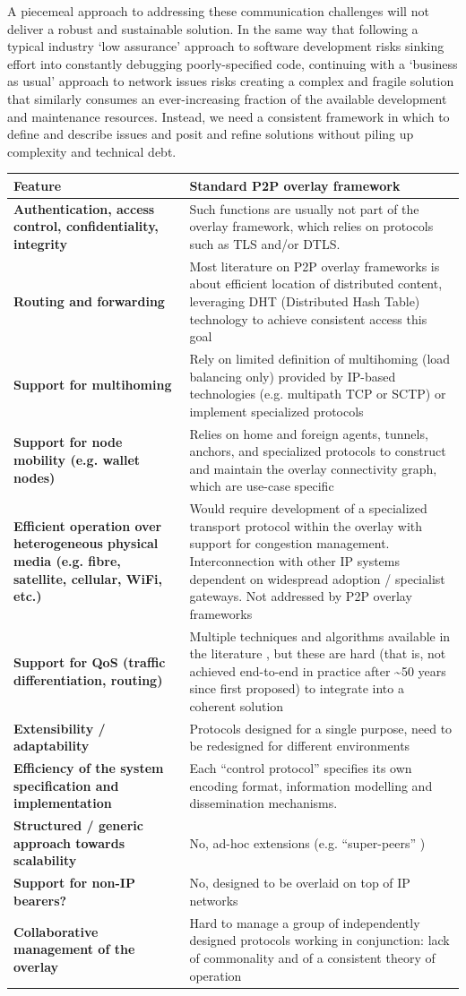 \documentclass[11pt,a4paper]{article}
\begin{document}
A piecemeal approach to addressing these communication challenges will
not deliver a robust and sustainable solution. In the same way that
following a typical industry `low assurance' approach to software
development risks sinking effort into constantly debugging
poorly-specified code, continuing with a `business as usual' approach to
network issues risks creating a complex and fragile solution that
similarly consumes an ever-increasing fraction of the available
development and maintenance resources. Instead, we need a consistent
framework in which to define and describe issues and posit and refine
solutions without piling up complexity and technical debt.

\begin{longtable}[]{p{6cm}p{8cm}}
\toprule
Feature & Standard P2P overlay framework\tabularnewline
\midrule
\endhead
\textbf{Authentication, access control, confidentiality, integrity} &
Such functions are usually not part of the overlay framework, which
relies on protocols such as TLS and/or DTLS.\tabularnewline
\textbf{Routing and forwarding} & Most literature on P2P overlay
frameworks is about efficient location of distributed content,
leveraging DHT (Distributed Hash Table) technology to achieve consistent
access this goal \cite{M15}\tabularnewline
\textbf{Support for multihoming} & Rely on limited definition of
multihoming (load balancing only) provided by IP-based technologies
(e.g. multipath TCP or SCTP) or implement specialized
protocols\tabularnewline
\textbf{Support for node mobility (e.g. wallet nodes)} & Relies on home
and foreign agents, tunnels, anchors, and specialized protocols to
construct and maintain the overlay connectivity graph, which are
use-case specific \cite{MA13}\tabularnewline
\textbf{Efficient operation over heterogeneous physical media (e.g.
fibre, satellite, cellular, WiFi, etc.)} & Would require development of
a specialized transport protocol within the overlay with support for
congestion management. Interconnection with other IP systems dependent
on widespread adoption / specialist gateways. Not addressed by P2P
overlay frameworks\tabularnewline
\textbf{Support for QoS (traffic differentiation, routing)} & Multiple
techniques and algorithms available in the literature \cite{RS14}, but
these are hard (that is, not achieved end-to-end in practice after
\textasciitilde{}50 years since first proposed) to integrate into a
coherent solution\tabularnewline
\textbf{Extensibility / adaptability} & Protocols designed for a single
purpose, need to be redesigned for different environments
\cite{S19}\tabularnewline
\textbf{Efficiency of the system specification and implementation} &
Each ``control protocol'' specifies its own encoding format, information
modelling and dissemination mechanisms.\tabularnewline
\textbf{Structured / generic approach towards scalability} & No, ad-hoc
extensions (e.g. ``super-peers'' \cite{M15})\tabularnewline
\textbf{Support for non-IP bearers?} & No, designed to be overlaid on
top of IP networks\tabularnewline
\textbf{Collaborative management of the overlay} & Hard to manage a
group of independently designed protocols working in conjunction: lack
of commonality and of a consistent theory of operation\tabularnewline
\bottomrule
\end{longtable}
\end{document}
